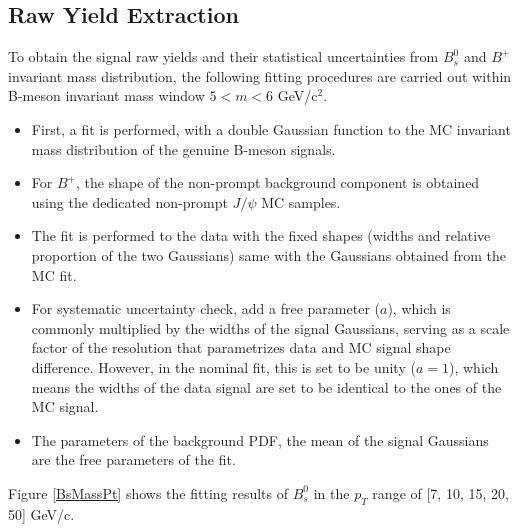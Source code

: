 \subsection{Raw Yield Extraction}


To obtain the signal raw yields and their statistical uncertainties from $B^0_s$ and $B^+$ invariant mass distribution, the following fitting procedures are carried out within B-meson invariant mass window $5 < m < 6$ GeV/c$^2$.

\begin{itemize}
\item First, a fit is performed, with a double Gaussian function to the MC invariant mass distribution of the genuine B-meson signals.
\item For $B^+$, the shape of the non-prompt background component is obtained using the dedicated non-prompt $J/\psi$ MC samples.
\item The fit is performed to the data with the fixed shapes (widths and relative proportion of the two Gaussians) same with the Gaussians obtained from the MC fit.
\item For systematic uncertainty check, add a free parameter ($a$), which is commonly multiplied by the widths of the signal Gaussians, serving as a scale factor of the resolution that parametrizes data and MC signal shape difference. However, in the nominal fit, this is set to be unity ($a = 1$), which means the widths of the data signal are set to be identical to the ones of the MC signal.
\item The parameters of the background PDF, the mean of the signal Gaussians are the free parameters of the fit.
\end{itemize}


Figure \ref{BsMassPt} shows the fitting results of $B^0_s$ in the $p_T$ range of [7, 10, 15, 20, 50] GeV/c.  


